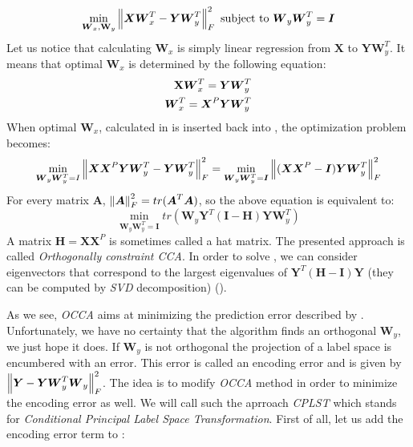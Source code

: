 \begin{equation}\label{eq:cplst1}
    \min_{\boldsymbol{W}_x, \bold{W}_y} \left\lVert\boldsymbol{X}\boldsymbol{W}_x^T-\boldsymbol{Y}\boldsymbol{W}_y^T\right\rVert_{F}^2  
    \text{  subject to   } \boldsymbol{W}_y\boldsymbol{W}_y^T=\boldsymbol{I}   
\end{equation}
Let us notice that calculating $\boldsymbol{W}_x$ is simply linear regression from $\boldsymbol{X}$ to $\boldsymbol{Y}\boldsymbol{W}_y^T$. It means that optimal $\boldsymbol{W}_x$ is determined by the following equation:
\begin{equation}\label{eq:cplst2}
\begin{split}
    \bold{X}\boldsymbol{W}_x^T=\boldsymbol{Y}\boldsymbol{W}_y^T \\
    \boldsymbol{W}_x^T=\boldsymbol{X}^P\boldsymbol{Y}\boldsymbol{W}_y^T
\end{split}
\end{equation}
When optimal $\boldsymbol{W}_x$, calculated in  is inserted back into , the optimization problem becomes:
\begin{equation}\label{eq:cplst3}
    \min_{\boldsymbol{W}_y\boldsymbol{W}_y^T=I} \left\lVert\boldsymbol{X}\boldsymbol{X}^P\boldsymbol{Y}\boldsymbol{W}_y^T-\boldsymbol{Y}\boldsymbol{W}_y^T\right\rVert_{F}^2=\min_{\boldsymbol{W}_y\boldsymbol{W}_y^T=\boldsymbol{I}} \left\lVert(\boldsymbol{X}\boldsymbol{X}^P-\boldsymbol{I})\boldsymbol{Y}\boldsymbol{W}_y^T\right\rVert_{F}^2
\end{equation}
For every matrix $\boldsymbol{A}$, $\left\lVert\boldsymbol{A}\right\rVert_{F}^2=tr(\boldsymbol{A}^T\boldsymbol{A})$, so the above equation is equivalent to:
\begin{equation}\label{eq:cplst4}
    \min_{\boldsymbol{W}_y\boldsymbol{W}_y^T=\boldsymbol{I}} tr(\boldsymbol{W}_y\boldsymbol{Y}^T(\boldsymbol{I}-\boldsymbol{H})\boldsymbol{Y}\boldsymbol{W}_y^T)
\end{equation}
A matrix $\boldsymbol{H}=\boldsymbol{X}\boldsymbol{X}^P$ is sometimes called a hat matrix. The presented approach is called \textit{Orthogonally constraint CCA}. In order to solve , we can consider eigenvectors that correspond to the largest eigenvalues of $\boldsymbol{Y}^T(\boldsymbol{H}-\boldsymbol{I})\boldsymbol{Y}$ (they can be computed by \textit{SVD} decomposition) (\cite{ChenLin}).

As we see, \textit{OCCA} aims at minimizing the prediction error described by . Unfortunately, we have no certainty that the algorithm finds an orthogonal $\boldsymbol{W}_y$, we just hope it does. If $\boldsymbol{W}_y$ is not orthogonal the projection of a label space is encumbered with an error. This error is called an encoding error and is given by $\left\lVert\boldsymbol{Y}-\boldsymbol{Y}\boldsymbol{W}_y^T\boldsymbol{W}_y\right\rVert_{F}^2$. The idea is to modify \textit{OCCA} method in order to minimize the encoding error as well. We will call such the aprroach \textit{CPLST} which stands for \textit{Conditional Principal Label Space Transformation}. First of all, let us add the encoding error term to : 

